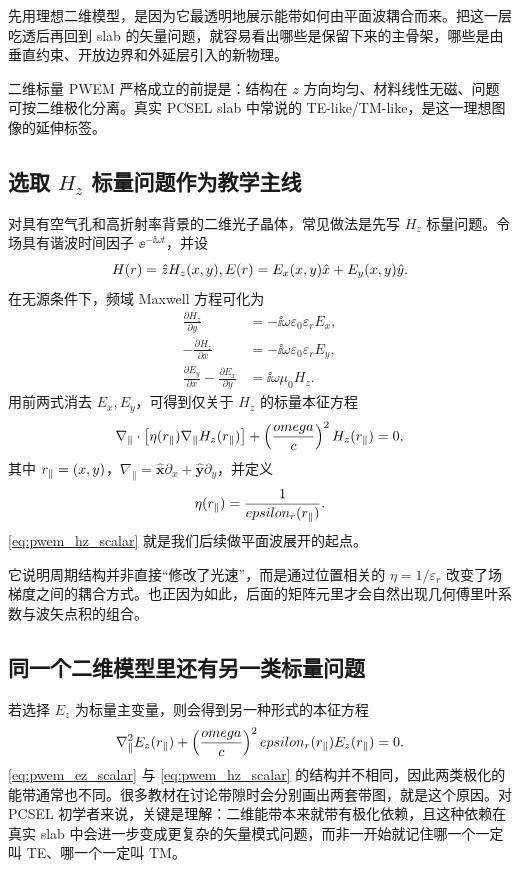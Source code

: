 先用理想二维模型，是因为它最透明地展示能带如何由平面波耦合而来。把这一层吃透后再回到 slab 的矢量问题，就容易看出哪些是保留下来的主骨架，哪些是由垂直约束、开放边界和外延层引入的新物理。

二维标量 PWEM 严格成立的前提是：结构在 $z$ 方向均匀、材料线性无磁、问题可按二维极化分离。真实 PCSEL slab 中常说的 TE-like/TM-like，是这一理想图像的延伸标签。

\subsection{选取 \texorpdfstring{$H_z$}{Hz} 标量问题作为教学主线}
对具有空气孔和高折射率背景的二维光子晶体，常见做法是先写 $H_z$ 标量问题。令场具有谐波时间因子 $\ee^{-\ii\omega t}$，并设
\begin{equation}
\Hf(\rvec)=\hat{\bm z}H_z(x,y),
\qquad
\E(\rvec)=E_x(x,y)\hat{\bm x}+E_y(x,y)\hat{\bm y}.
\end{equation}
在无源条件下，频域 Maxwell 方程可化为
\begin{align}
\frac{\partial H_z}{\partial y} &= -\ii\omega\varepsilon_0\varepsilon_r E_x,
\\
-\frac{\partial H_z}{\partial x} &= -\ii\omega\varepsilon_0\varepsilon_r E_y,
\\
\frac{\partial E_y}{\partial x}-\frac{\partial E_x}{\partial y} &= \ii\omega\mu_0 H_z.
\end{align}
用前两式消去 $E_x,E_y$，可得到仅关于 $H_z$ 的标量本征方程
\begin{equation}
\nabla_{\parallel}\cdot\left[\eta(r_{\parallel})\nabla_{\parallel} H_z(r_{\parallel})\right]
+
\left(\frac{omega}{c}\right)^2 H_z(r_{\parallel})=0,
\label{eq:pwem_hz_scalar}
\end{equation}
其中 $r_{\parallel}=(x,y)$，$\nabla_{\parallel}=\hat{\bm x}\partial_x+\hat{\bm y}\partial_y$，并定义
\begin{equation}
\eta(r_{\parallel})=\frac{1}{epsilon_r(r_{\parallel})}.
\end{equation}
\cref{eq:pwem_hz_scalar} 就是我们后续做平面波展开的起点。

它说明周期结构并非直接“修改了光速”，而是通过位置相关的 $\eta=1/\varepsilon_r$ 改变了场梯度之间的耦合方式。也正因为如此，后面的矩阵元里才会自然出现几何傅里叶系数与波矢点积的组合。

\subsection{同一个二维模型里还有另一类标量问题}
若选择 $E_z$ 为标量主变量，则会得到另一种形式的本征方程
\begin{equation}
\nabla_{\parallel}^2 E_z(r_{\parallel})
+
\left(\frac{omega}{c}\right)^2epsilon_r(r_{\parallel})E_z(r_{\parallel})=0.
\label{eq:pwem_ez_scalar}
\end{equation}
\cref{eq:pwem_ez_scalar} 与 \cref{eq:pwem_hz_scalar} 的结构并不相同，因此两类极化的能带通常也不同。很多教材在讨论带隙时会分别画出两套带图，就是这个原因。对 PCSEL 初学者来说，关键是理解：二维能带本来就带有极化依赖，且这种依赖在真实 slab 中会进一步变成更复杂的矢量模式问题，而非一开始就记住哪一个一定叫 TE、哪一个一定叫 TM。

